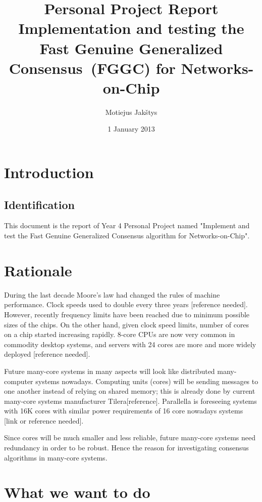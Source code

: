 \documentclass[english,11pt]{article}
\newcommand{\fggc}{Fast Genuine Generalized Consensus\ }
\begin{document}
\title{Personal Project Report\\
    Implementation and testing the \fggc (FGGC) for Networks-on-Chip}
\author{Motiejus Jakštys}
\date{1 January 2013}

\maketitle
\pagebreak
\tableofcontents
\pagebreak

\section{Introduction}
\subsection{Identification}

This document is the report of Year 4 Personal Project named "Implement and
test the Fast Genuine Generalized Consensus algorithm for Networks-on-Chip".

\section{Rationale}

During the last decade Moore's law had changed the rules of machine
performance. Clock speeds used to double every three years [reference needed].
However, recently frequency limits have been reached due to minimum possible
sizes of the chips. On the other hand, given clock speed limits, number of
cores on a chip started increasing rapidly. 8-core CPUs are now very common in
commodity desktop systems, and servers with 24 cores are more and more widely
deployed [reference needed].

Future many-core systems in many aspects will look like distributed
many-computer systems nowadays. Computing units (cores) will be sending messages
to one another instead of relying on shared memory; this is already done by
current many-core systems manufacturer Tilera[reference]. Parallella is
foreseeing systems with 16K cores with similar power requirements of 16 core
nowadays systems [link or reference needed].

Since cores will be much smaller and less reliable, future many-core systems
need redundancy in order to be robust. Hence the reason for investigating
consensus algorithms in many-core systems.

\section{What we want to do}
\end{document}
